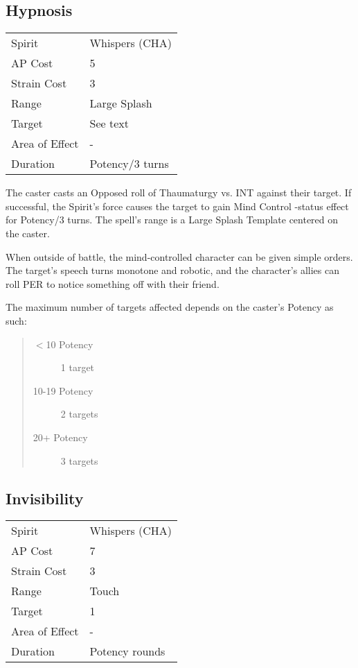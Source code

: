 \documentclass[11pt,a4paper,twocolumn]{book}
\begin{document}
\subsection*{Hypnosis}
{
	\begin{tabu} to 75mm{| X[l,4] | X[l,7] |}
		\hline
		Spirit         & Whispers (CHA)  \\
		AP Cost        & 5               \\
		Strain Cost    & 3               \\
		Range          & Large Splash    \\
		Target         & See text        \\
		Area of Effect & -               \\
		Duration       & Potency/3 turns \\ \hline
	\end{tabu}
	
}

\medskip

The caster casts an Opposed roll of Thaumaturgy vs. INT against their target. If successful, the Spirit's force causes the target to gain Mind Control -status effect for Potency/3 turns. The spell's range is a Large Splash Template centered on the caster. 

When outside of battle, the mind-controlled character can be given simple orders. The target's speech turns monotone and robotic, and the character's allies can roll PER to notice something off with their friend.

The maximum number of targets affected depends on the caster's Potency as such:

\begin{quote}
	\begin{description}
		\item[$<$10 Potency] 	1 target
		\item[10-19 Potency] 	2 targets
		\item[20+ Potency]  	3 targets
	\end{description}	
\end{quote}



\subsection*{Invisibility}
{
	\begin{tabu} to 75mm{| X[l,4] | X[l,7] |}
		\hline
		Spirit         & Whispers (CHA) \\
		AP Cost        & 7              \\
		Strain Cost    & 3              \\
		Range          & Touch          \\
		Target         & 1              \\
		Area of Effect & -              \\
		Duration       & Potency rounds \\ \hline
	\end{tabu}
	
}
\end{document}
